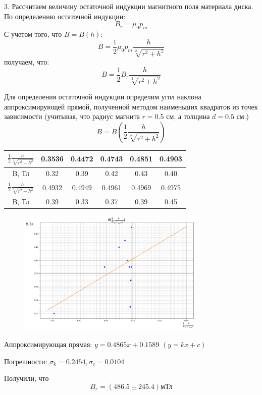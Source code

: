 \documentclass[a4paper]{article}
\begin{document}
3. Рассчитаем величину остаточной индукции магнитного поля материала диска. По определению остаточной индукции:
	\[ B_{r}= \mu_{0} p_{m}\]
	С учетом того, что $B = B(h)$:
    \[ B = \frac{1}{2} \mu_{0} p_{m} \frac{h}{\sqrt[2]{r^{2} + h^{2}}}\]
    получаем, что:
    \[ B = \frac{1}{2} B_{r} \frac{h}{\sqrt[2]{r^{2} + h^{2}}}\]

	Для определения остаточной индукции определим угол наклона аппроксимирующей прямой, полученной методом наименьших квадратов из точек зависимости (учитывая, что радиус магнита $r = 0.5$ см, а толщина $d = 0.5$ см.)
	\[ B = B(\frac{1}{2} \frac{h}{\sqrt[2]{r^{2} + h^{2}}})\]
    
    \begin{table}[!htbp]
    	\begin{tabular}{|c|c|c|c|c|c|} \hline
    	$\frac{1}{2} \frac{h}{\sqrt[2]{r^{2} + h^{2}}}$ & 0.3536 & 0.4472 & 0.4743 & 0.4851 & 0.4903 \\ \hline
        B, Тл & 0.32 & 0.39 & 0.42 & 0.43 & 0.40 \\ \hline
        $\frac{1}{2} \frac{h}{\sqrt[2]{r^{2} + h^{2}}}$ & 0.4932 & 0.4949 & 0.4961 & 0.4969 & 0.4975 \\ \hline
        B, Тл & 0.39 & 0.33 & 0.37 & 0.39 & 0.45 \\ \hline
    	\end{tabular}
    \centering
    \end{table}

    \begin{figure}[H]
    \centering
    \includegraphics[width=0.8\textwidth]{1_2_ris4.png}
    \end{figure}
    Аппроксимирующая прямая: $y = 0.4865x + 0.1589$  $(y = kx + c)$
    
    Погрешности: $\sigma_{k} = 0.2454, \sigma_{c} = 0.0104$
    
    Получили, что 
    \[ B_{r} = (486.5 \pm 245.4) \text{мТл}\]
\end{document}

